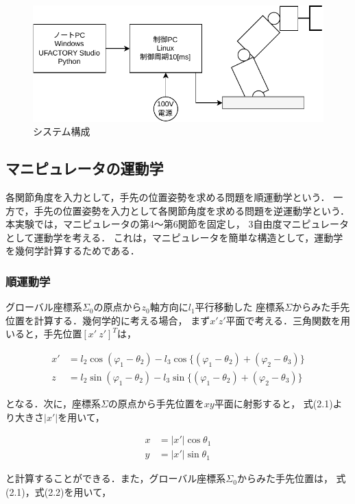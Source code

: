\begin{figure}[h]
  \centering
  \includegraphics[scale=1]{sozai/1.pdf}
  \caption{システム構成}
\end{figure}


\subsection{マニピュレータの運動学}
各関節角度を入力として，手先の位置姿勢を求める問題を順運動学という．
一方で，手先の位置姿勢を入力として各関節角度を求める問題を逆運動学という．
本実験では，マニピュレータの第4～第6関節を固定し，
3自由度マニピュレータとして運動学を考える．
これは，マニピュレータを簡単な構造として，運動学を幾何学計算するためである．

\subsubsection{順運動学}
グローバル座標系$\Sigma_0$の原点から$z_0$軸方向に$l_1$平行移動した
座標系$\Sigma$からみた手先位置を計算する．幾何学的に考える場合，
まず$x'z'$平面で考える．三角関数を用いると，手先位置$[x' \ z']^T$は，

\begin{align}
  x' & = l_2 \cos (\varphi_1 - \theta_2) - l_3 \cos \{ (\varphi_1 - \theta_2) + (\varphi_2 - \theta_3) \} \tag{2.1} \\
  z  & = l_2 \sin (\varphi_1 - \theta_2) - l_3 \sin \{ (\varphi_1 - \theta_2) + (\varphi_2 - \theta_3) \} 
\end{align}

となる．次に，座標系$\Sigma$の原点から手先位置を$xy$平面に射影すると，
式(2.1)より大きさ$|x'|$を用いて，

\begin{align}
  x & = |x'| \cos \theta_1 \tag{2.2} \\
  y & = |x'| \sin \theta_1 
\end{align}

と計算することができる．また，グローバル座標系$\Sigma_0$からみた手先位置は，
式(2.1)，式(2.2)を用いて，

